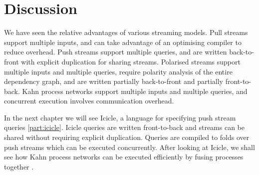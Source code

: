 

\section{Discussion}
We have seen the relative advantages of various streaming models.
Pull streams support multiple inputs, and can take advantage of an optimising compiler to reduce overhead.
Push streams support multiple queries, and are written back-to-front with explicit duplication for sharing streams.
Polarised streams support multiple inputs and multiple queries, require polarity analysis of the entire dependency graph, and are written partially back-to-front and partially front-to-back.
Kahn process networks support multiple inputs and multiple queries, and concurrent execution involves communication overhead.

In the next chapter we will see Icicle, a language for specifying push stream queries \autoref{part:icicle}.
Icicle queries are written front-to-back and streams can be shared without requiring explicit duplication.
Queries are compiled to folds over push streams which can be executed concurrently.
After looking at Icicle, we shall see how Kahn process networks can be executed efficiently by fusing processes together .

